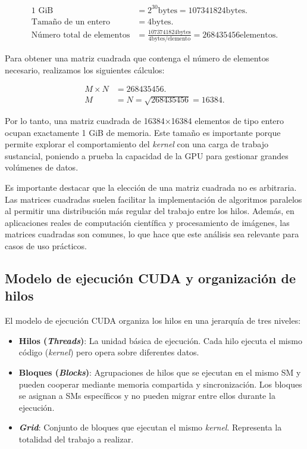         \begin{align*}
            \text{1 GiB} &= 2^{30} \text{bytes} = 107341824 \text{bytes}.\\
            \text{Tamaño de un entero} &= 4 \text{bytes}.\\
            \text{Número total de elementos} &= \frac{1073741824 \text{bytes}}{4 \text{bytes/elemento}} = 268435456 \text{elementos}.
        \end{align*}
        
        Para obtener una matriz cuadrada que contenga el número de elementos necesario, realizamos los siguientes cálculos:
        
        \begin{align*}
            M \times N &= 268435456.\\
            M &= N = \sqrt{268435456} = 16384.
        \end{align*}

        Por lo tanto, una matriz cuadrada de 16384×16384 elementos de tipo entero ocupan exactamente 1 GiB de memoria. Este tamaño es importante porque permite explorar el comportamiento del \textit{kernel} con una carga de trabajo sustancial, poniendo a prueba la capacidad de la GPU para gestionar grandes volúmenes de datos.
        
        Es importante destacar que la elección de una matriz cuadrada no es arbitraria. Las matrices cuadradas suelen facilitar la implementación de algoritmos paralelos al permitir una distribución más regular del trabajo entre los hilos. Además, en aplicaciones reales de computación científica y procesamiento de imágenes, las matrices cuadradas son comunes, lo que hace que este análisis sea relevante para casos de uso prácticos.

    \subsection{Modelo de ejecución CUDA y organización de hilos}

        El modelo de ejecución CUDA organiza los hilos en una jerarquía de tres niveles:

        \begin{itemize}
        
            \item \textbf{Hilos (\textit{Threads})}: La unidad básica de ejecución. Cada hilo ejecuta el mismo código (\textit{kernel}) pero opera sobre diferentes datos.
            
            \item \textbf{Bloques (\textit{Blocks})}: Agrupaciones de hilos que se ejecutan en el mismo SM y pueden cooperar mediante memoria compartida y sincronización. Los bloques se asignan a SMs específicos y no pueden migrar entre ellos durante la ejecución.
            
            \item \textbf{\textit{Grid}}: Conjunto de bloques que ejecutan el mismo \textit{kernel}. Representa la totalidad del trabajo a realizar.
            
        \end{itemize}
        
